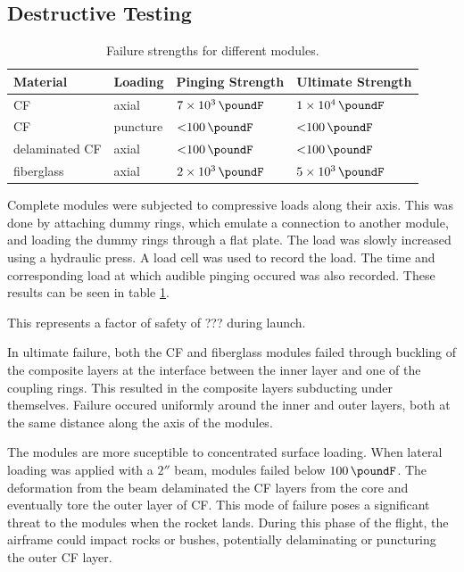 \documentclass{aiaa-tc}%
\begin{document}
\subsection{Destructive Testing}

\begin{table}
	\centering
	\caption{Failure strengths for different modules.}\label{tab:compression}
	\begin{tabular}{llll}
		Material & Loading & Pinging Strength & Ultimate Strength\\
		\hline
		CF 		& axial 	& $\SI{7e3}{\poundF}$ 	& $\SI{1e4}{\poundF}$ \\
		CF 		& puncture 	& $\SI{<100}{\poundF}$	& $\SI{<100}{\poundF}$\\
		delaminated CF 	& axial 	& $\SI{<100}{\poundF}$	& $\SI{<100}{\poundF}$\\
		fiberglass 	& axial 	& $\SI{2e3}{\poundF}$ 	& $\SI{5e3}{\poundF}$ \\
	\end{tabular}
\end{table}

Complete modules were subjected to compressive loads along their axis. This was done by attaching dummy rings, which emulate a connection to another module, and loading the dummy rings through a flat plate. 
The load was slowly increased using a hydraulic press. 
A load cell was used to record the load. The time and corresponding load at which audible pinging occured was also recorded.
These results can be seen in table \ref{tab:compression}.

This represents a factor of safety of ???
during launch.

In ultimate failure, both the CF and fiberglass modules failed through buckling of the composite layers at the interface between the inner layer and one of the coupling rings.
This resulted in the composite layers subducting under themselves.
Failure occured uniformly around the inner and outer layers, both at the same distance along the axis of the modules. 

The modules are more suceptible to concentrated surface loading. 
When lateral loading was applied with a $2''$ beam, modules failed below $\SI{100}{\poundF}$. 
The deformation from the beam delaminated the CF layers from the core and eventually tore the outer layer of CF. 
This mode of failure poses a significant threat to the modules when the rocket lands. 
During this phase of the flight, the airframe could impact rocks or bushes, potentially delaminating or puncturing the outer CF layer. 
\end{document}
